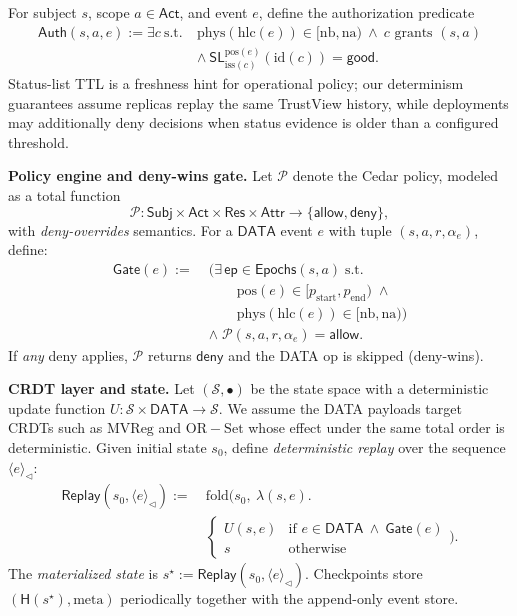 \documentclass[10pt,journal,compsoc]{IEEEtran}
\begin{document}
\medskip
For subject $s$, scope $a\!\in\!\mathsf{Act}$, and event $e$, define the authorization predicate
\[
\begin{aligned}
\mathsf{Auth}(s,a,e) := \exists c\ \text{s.t.}\ & \mathrm{phys}(\mathrm{hlc}(e)) \in [\mathrm{nb},\mathrm{na})\ \land\ c \text{ grants }(s,a)\\
& \land\ \mathsf{SL}^{\mathrm{pos}(e)}_{\mathrm{iss}(c)}(\mathrm{id}(c))=\mathsf{good}.
\end{aligned}
\]
Status-list TTL is a freshness hint for operational policy; our determinism guarantees assume replicas replay the same TrustView history, while deployments may additionally deny decisions when status evidence is older than a configured threshold.

\medskip
\noindent\textbf{Policy engine and deny-wins gate.}
Let $\mathcal{P}$ denote the Cedar policy, modeled as a total function
\[
  \mathcal{P} : \mathsf{Subj}\times\mathsf{Act}\times\mathsf{Res}\times\mathsf{Attr}\to\{\mathsf{allow},\mathsf{deny}\},
\]
with \emph{deny-overrides} semantics.
For a $\mathsf{DATA}$ event $e$ with tuple $(s,a,r,\alpha_e)$, define:
\[
\begin{aligned}
\mathsf{Gate}(e) :=\;&
\Big(
    \exists\, \mathsf{ep} \in \mathsf{Epochs}(s,a)
    \;\text{s.t.}\; \\
&\qquad
    \mathrm{pos}(e) \in [p_{\mathrm{start}}, p_{\mathrm{end}})
    \;\wedge \\
&\qquad
    \mathrm{phys}(\mathrm{hlc}(e))
    \in [\mathrm{nb}, \mathrm{na})
\Big) \\
&\wedge\;
\mathcal{P}(s,a,r,\alpha_e) = \mathsf{allow}.
\end{aligned}
\]
If \emph{any} deny applies, $\mathcal{P}$ returns $\mathsf{deny}$ and the DATA op is skipped (deny-wins).

\medskip
\noindent\textbf{CRDT layer and state.}
Let $(\mathcal{S},\bullet)$ be the state space with a deterministic update function
$U:\mathcal{S}\times\mathsf{DATA}\to\mathcal{S}$.
We assume the DATA payloads target CRDTs such as $\mathrm{MVReg}$ and $\mathrm{OR\!-\!Set}$ whose effect under the same total order is deterministic.
Given initial state $s_0$, define \emph{deterministic replay} over the sequence $\langle e\rangle_{\triangleleft}$:
\[
\begin{aligned}
\mathsf{Replay}(s_0, \langle e\rangle_{\triangleleft}) :=\ &
\mathrm{fold}\Big(s_0,\ \lambda(s,e).\\
& \begin{cases}
  U(s,e) & \text{if } e\in\mathsf{DATA}\ \land\ \mathsf{Gate}(e)\\
  s      & \text{otherwise}
  \end{cases}\Big).
\end{aligned}
\]
The \emph{materialized state} is $s^\star := \mathsf{Replay}(s_0,\langle e\rangle_{\triangleleft})$.
Checkpoints store $(\mathsf{H}(s^\star),\mathrm{meta})$ periodically together with the append-only event store.
\end{document}
